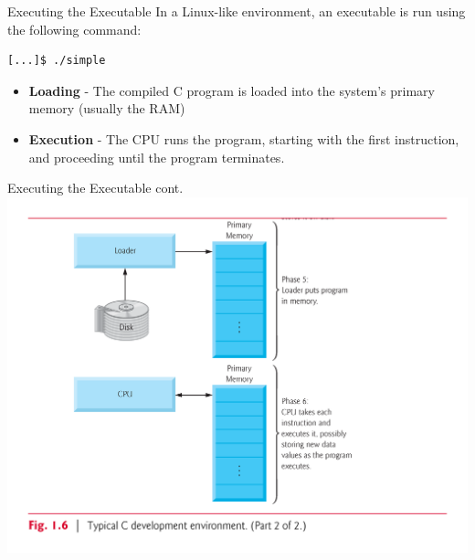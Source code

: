 \documentclass[11pt]{beamer}
\begin{document}
\begin{frame}[fragile=singleslide]{Executing the Executable}
In a Linux-like environment, an executable is run using the following command:
\begin{verbatim}
[...]$ ./simple
\end{verbatim}
\begin{itemize}
\item \textbf{Loading} - The compiled C program is loaded into the system's primary memory (usually the RAM)
\item \textbf{Execution} - The CPU runs the program, starting with the first instruction, and proceeding until the program terminates.  
\end{itemize}
\end{frame}

\begin{frame}{Executing the Executable cont.}
\center
\includegraphics[scale=0.35]{execute.png}
\end{frame}
\end{document}
